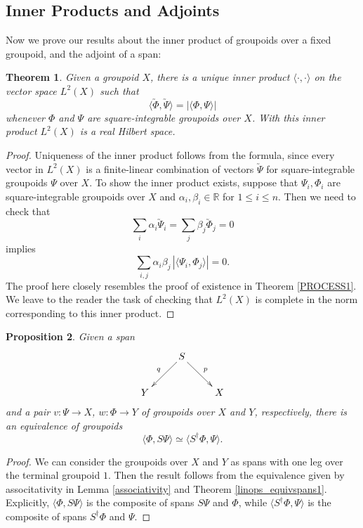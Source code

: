 \documentclass{article}
\renewcommand{\to}{\rightarrow}
\newcommand{\maps}{\colon}
\newcommand{\R}{{\mathbb R}}
\newcommand{\ip}[2]{\langle #1,#2 \rangle}
\newtheorem{thm}{Theorem}
\newtheorem{proposition}[thm]{Proposition}
\begin{document}
\subsection{Inner Products and Adjoints}
\label{innerprodandadjoint}

Now we prove our results about the inner product of groupoids over
a fixed groupoid, and the adjoint of a span:

\begin{thm}\label{innerprod_theorem}
Given a groupoid $X$, there is a unique inner product $\ip{\cdot}{\cdot}$ 
on the vector space $L^2(X)$ such that
\[ \ip{\utilde{\Phi}}{\utilde{\Psi}} = |\ip{\Phi}{\Psi}| \]
whenever $\Phi$ and $\Psi$ are square-integrable groupoids over $X$.
With this inner product $L^2(X)$ is a real Hilbert space.
\end{thm}

\begin{proof}
Uniqueness of the inner product follows from the formula, since every vector 
in $L^2(X)$ is a finite-linear combination of vectors
$\utilde{\Psi}$ for square-integrable groupoids $\Psi$ over $X$.
To show the inner product exists, suppose that $\Psi_i, \Phi_i$ are
square-integrable groupoids over $X$ and $\alpha_i, \beta_i \in \R$
for $1 \le i \le n$.  Then we need to check that 
\[ \sum_{i}\alpha_i\utilde{\Psi}_i 
= \sum_{j}\beta_j \utilde{\Phi}_j = 0 \]
implies
\[ \sum_{i,j} \alpha_i\beta_j \, 
 |\langle \Psi_i, \Phi_j \rangle | = 0.\]
The proof here closely resembles the proof of existence in
Theorem \ref{PROCESS1}.  We leave to the reader the task of 
checking that $L^2(X)$ is complete in the norm corresponding 
to this inner product.
\end{proof}

\begin{proposition}\label{innerprod_adjoint}
Given a span
\[
\xymatrix{
& S \ar[dl]_{q} \ar[dr]^{p} & \\
Y & & X
}
\]
and a pair $v \maps \Psi \to X$, $w \maps \Phi \to Y$ of 
groupoids over $X$ and $Y$, respectively, there is an equivalence of groupoids
\[ \langle \Phi,S\Psi \rangle \simeq \langle S^\dagger\Phi,\Psi \rangle. \]
\end{proposition}
\begin{proof}
We can consider the groupoids over $X$ and $Y$ as spans with one leg
over the terminal groupoid $1$.  Then the result follows from the
equivalence given by associtativity in Lemma \ref{associativity} and Theorem
\ref{linops_equivspans1}.
Explicitly, $ \langle \Phi,S\Psi \rangle$ is the composite of spans $S\Psi$
and $\Phi$, while $\langle S^\dagger\Phi,\Psi \rangle$ is the composite
of spans $S^\dagger\Phi$ and $\Psi$.
\end{proof}
\end{document}
